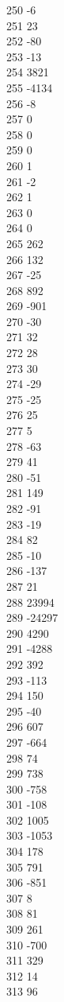 { 250	-6 \\
 251	23 \\
 252	-80 \\
 253	-13 \\
 254	3821 \\
 255	-4134 \\
 256	-8 \\
 257	0 \\
 258	0 \\
 259	0 \\
 260	1 \\
 261	-2 \\
 262	1 \\
 263	0 \\
 264	0 \\
 265	262 \\
 266	132 \\
 267	-25 \\
 268	892 \\
 269	-901 \\
 270	-30 \\
 271	32 \\
 272	28 \\
 273	30 \\
 274	-29 \\
 275	-25 \\
 276	25 \\
 277	5 \\
 278	-63 \\
 279	41 \\
 280	-51 \\
 281	149 \\
 282	-91 \\
 283	-19 \\
 284	82 \\
 285	-10 \\
 286	-137 \\
 287	21 \\
 288	23994 \\
 289	-24297 \\
 290	4290 \\
 291	-4288 \\
 292	392 \\
 293	-113 \\
 294	150 \\
 295	-40 \\
 296	607 \\
 297	-664 \\
 298	74 \\
 299	738 \\
 300	-758 \\
 301	-108 \\
 302	1005 \\
 303	-1053 \\
 304	178 \\
 305	791 \\
 306	-851 \\
 307	8 \\
 308	81 \\
 309	261 \\
 310	-700 \\
 311	329 \\
 312	14 \\
 313	96 \\
}
